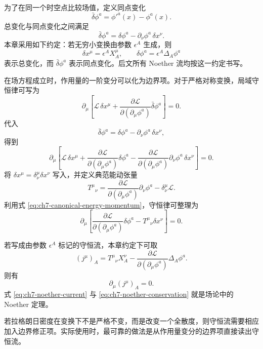为了在同一个时空点比较场值，定义同点变化
\[
\bar{\delta}\phi^{a}=\phi'^{a}(x)-\phi^{a}(x).
\]
总变化与同点变化之间满足
\begin{equation}
	\bar{\delta}\phi^{a}
	=
	\delta\phi^{a}-\partial_{\nu}\phi^{a}\,\delta x^{\nu}.
	\label{eq:ch7-same-point-variation}
\end{equation}
本章采用如下约定：若无穷小变换由参数 $\epsilon^{A}$ 生成，则
\[
\delta x^{\mu}=\epsilon^{A}X_{A}^{\mu},
\qquad
\delta\phi^{a}=\epsilon^{A}\Delta_{A}\phi^{a}
\]
表示总变化，而 $\bar{\delta}\phi^{a}$ 表示同点变化。后文所有 Noether 流均按这一约定书写。

在场方程成立时，作用量的一阶变分可以化为边界项。对于严格对称变换，局域守恒律可写为
\[
\partial_{\mu}\left[
\mathcal{L}\,\delta x^{\mu}
+
\frac{\partial\mathcal{L}}{\partial(\partial_{\mu}\phi^{a})}
\bar{\delta}\phi^{a}
\right]=0.
\]
代入
\[
\bar{\delta}\phi^{a}
=
\delta\phi^{a}-\partial_{\nu}\phi^{a}\,\delta x^{\nu},
\]
得到
\[
\partial_{\mu}\left[
\mathcal{L}\,\delta x^{\mu}
+
\frac{\partial\mathcal{L}}{\partial(\partial_{\mu}\phi^{a})}
\delta\phi^{a}
-
\frac{\partial\mathcal{L}}{\partial(\partial_{\mu}\phi^{a})}
\partial_{\nu}\phi^{a}\,\delta x^{\nu}
\right]=0.
\]
将 $\delta x^{\mu}=\delta^{\mu}_{\nu}\delta x^{\nu}$ 写入，并定义典范能动张量
\begin{equation}
	T^{\mu}{}_{\nu}
	=
	\frac{\partial\mathcal{L}}{\partial(\partial_{\mu}\phi^{a})}
	\partial_{\nu}\phi^{a}
	-
	\delta^{\mu}_{\nu}\mathcal{L}.
	\label{eq:ch7-canonical-energy-momentum}
\end{equation}
利用式 \eqref{eq:ch7-canonical-energy-momentum}，守恒律可整理为
\[
\partial_{\mu}\left[
\frac{\partial\mathcal{L}}{\partial(\partial_{\mu}\phi^{a})}
\delta\phi^{a}
-
T^{\mu}{}_{\nu}\delta x^{\nu}
\right]=0.
\]

若写成由参数 $\epsilon^{A}$ 标记的守恒流，本章约定下可取
\begin{equation}
	(j^{\mu})_{A}
	=
	T^{\mu}{}_{\nu}X_{A}^{\nu}
	-
	\frac{\partial\mathcal{L}}{\partial(\partial_{\mu}\phi^{a})}
	\Delta_{A}\phi^{a}.
	\label{eq:ch7-noether-current}
\end{equation}
则有
\begin{equation}
	\partial_{\mu}(j^{\mu})_{A}=0.
	\label{eq:ch7-noether-conservation}
\end{equation}
式 \eqref{eq:ch7-noether-current} 与 \eqref{eq:ch7-noether-conservation} 就是场论中的 Noether 定理。

若拉格朗日密度在变换下不是严格不变，而是改变一个全散度，则守恒流需要相应加入边界修正项。实际使用时，最可靠的做法是从作用量变分的边界项直接读出守恒流。


